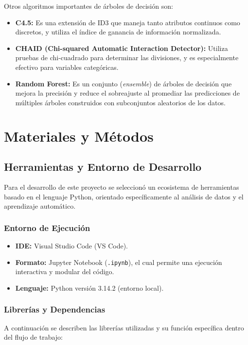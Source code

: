 \documentclass[12pt]{article}
\begin{document}
Otros algoritmos importantes de árboles de decisión son:
\begin{itemize}
    \item \textbf{C4.5:} Es una extensión de ID3 que maneja tanto atributos continuos como discretos, y utiliza el índice de ganancia de información normalizada.
    \item \textbf{CHAID (Chi-squared Automatic Interaction Detector):} Utiliza pruebas de chi-cuadrado para determinar las divisiones, y es especialmente efectivo para variables categóricas.
    \item \textbf{Random Forest:} Es un conjunto (\textit{ensemble}) de árboles de decisión que mejora la precisión y reduce el sobreajuste al promediar las predicciones de múltiples árboles construidos con subconjuntos aleatorios de los datos.
\end{itemize}

\cite{De0a100enIA_3}

\section{Materiales y Métodos}
\subsection{Herramientas y Entorno de Desarrollo}

Para el desarrollo de este proyecto se seleccionó un ecosistema de herramientas basado en el lenguaje Python, orientado específicamente al análisis de datos y el aprendizaje automático.

\subsubsection{Entorno de Ejecución}
\begin{itemize}
    \item \textbf{IDE:} Visual Studio Code (VS Code).
    \item \textbf{Formato:} Jupyter Notebook (\texttt{.ipynb}), el cual permite una ejecución interactiva y modular del código.
    \item \textbf{Lenguaje:} Python versión 3.14.2 (entorno local).
\end{itemize}

\subsubsection{Librerías y Dependencias}
A continuación se describen las librerías utilizadas y su función específica dentro del flujo de trabajo:
\end{document}
